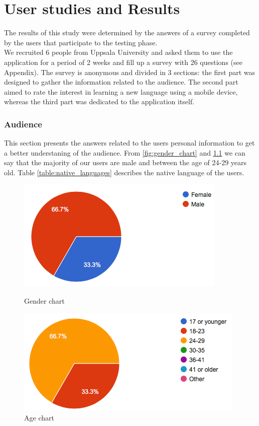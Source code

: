 \chapter{User studies and Results}
\label{chap:results}

The results of this study were determined by the answers of a survey completed by the users that participate to the testing phase. \\
\noindent We recruited 6 people from Uppsala University and asked them to use the application for a period of 2 weeks and fill up a survey with 26 questions (see Appendix). The survey is anonymous and divided in 3 sections: the first part was designed to gather the information related to the audience. The second part aimed to rate the interest in learning a new language using a mobile device, whereas the third part was dedicated to the application itself. \\

\subsection*{Audience}
\label{sub:Audience}

This section presents the answers related to the users personal information to get a better understaning of the audience. From \ref{fig:gender_chart} and \ref{fig:age_chart} we can say that the majority of our users are male and between the age of 24-29 years old.  Table \ref{table:native_languages} describes the native language of the users.

\begin{figure}[!ht]
	\centering
	\begin{minipage}{.5\textwidth}
		\centering
		\includegraphics[scale=0.5]{Figures/responses/audience_gender.png}
		\caption{Gender chart}
		\label{fig:gender_chart}
	\end{minipage}%
	\begin{minipage}{.5\textwidth}
		\centering
		\includegraphics[scale=0.5]{Figures/responses/audience_age.png}
		\caption{Age chart}
		\label{fig:age_chart}
	\end{minipage}
\end{figure}

